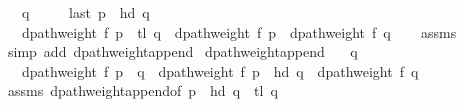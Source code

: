 \begin{isabellebody}
\ \ \ {\isachardoublequoteopen}q\ {\isasymnoteq}\ {\isacharbrackleft}{\kern0pt}{\isacharbrackright}{\kern0pt}{\isachardoublequoteclose}\isanewline
\ \ \ {\isachardoublequoteopen}last\ p\ {\isacharequal}{\kern0pt}\ hd\ q{\isachardoublequoteclose}\isanewline
\ \ \ {\isachardoublequoteopen}dpath{\isacharunderscore}{\kern0pt}weight\ f\ {\isacharparenleft}{\kern0pt}p\ {\isacharat}{\kern0pt}\ tl\ q{\isacharparenright}{\kern0pt}\ {\isacharequal}{\kern0pt}\ dpath{\isacharunderscore}{\kern0pt}weight\ f\ p\ {\isacharplus}{\kern0pt}\ dpath{\isacharunderscore}{\kern0pt}weight\ f\ q{\isachardoublequoteclose}%
\endisataginvisible
{\isafoldinvisible}%
%
\isadeliminvisible
\isanewline
%
\endisadeliminvisible
%
\isadelimproof
\ \ %
\endisadelimproof
%
\isatagproof
{}\isamarkupfalse%
\ assms\isanewline
\ \ \isamarkupfalse%
\ {\isacharparenleft}{\kern0pt}simp\ add{\isacharcolon}{\kern0pt}\ dpath{\isacharunderscore}{\kern0pt}weight{\isacharunderscore}{\kern0pt}append{\isacharparenright}{\kern0pt}%
\endisatagproof
{\isafoldproof}%
%
\isadelimproof
\isanewline
%
\endisadelimproof
%
\isadeliminvisible
\isanewline
%
\endisadeliminvisible
%
\isataginvisible
{}\isamarkupfalse%
\ dpath{\isacharunderscore}{\kern0pt}weight{\isacharunderscore}{\kern0pt}append{\isacharunderscore}{\kern0pt}{}{\isacharcolon}{\kern0pt}\isanewline
\ \ \ {\isachardoublequoteopen}q\ {\isasymnoteq}\ {\isacharbrackleft}{\kern0pt}{\isacharbrackright}{\kern0pt}{\isachardoublequoteclose}\isanewline
\ \ \ {\isachardoublequoteopen}dpath{\isacharunderscore}{\kern0pt}weight\ f\ {\isacharparenleft}{\kern0pt}p\ {\isacharat}{\kern0pt}\ q{\isacharparenright}{\kern0pt}\ {\isacharequal}{\kern0pt}\ dpath{\isacharunderscore}{\kern0pt}weight\ f\ {\isacharparenleft}{\kern0pt}p\ {\isacharat}{\kern0pt}\ {\isacharbrackleft}{\kern0pt}hd\ q{\isacharbrackright}{\kern0pt}{\isacharparenright}{\kern0pt}\ {\isacharplus}{\kern0pt}\ dpath{\isacharunderscore}{\kern0pt}weight\ f\ q{\isachardoublequoteclose}%
\endisataginvisible
{\isafoldinvisible}%
%
\isadeliminvisible
\isanewline
%
\endisadeliminvisible
%
\isadelimproof
\ \ %
\endisadelimproof
%
\isatagproof
{}\isamarkupfalse%
\ assms\ dpath{\isacharunderscore}{\kern0pt}weight{\isacharunderscore}{\kern0pt}append{\isacharbrackleft}{\kern0pt}of\ {\isachardoublequoteopen}p\ {\isacharat}{\kern0pt}\ {\isacharbrackleft}{\kern0pt}hd\ q{\isacharbrackright}{\kern0pt}{\isachardoublequoteclose}\ {\isacharunderscore}{\kern0pt}\ {\isachardoublequoteopen}tl\ q{\isachardoublequoteclose}{\isacharbrackright}{\kern0pt}\isanewline

\end{isabellebody}
